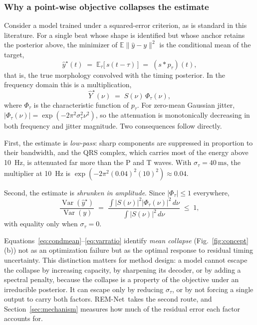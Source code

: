 \documentclass[lettersize,journal]{IEEEtran}
\newcommand{\remnet}{REM-Net\xspace}
\begin{document}
\subsubsection*{Why a point-wise objective collapses the estimate}
Consider a model trained under a squared-error criterion, as is standard in this literature. For a single beat whose shape is identified but whose anchor retains the posterior above, the minimizer of $\mathbb{E}\lVert \hat{y} - y \rVert^2$ is the conditional mean of the target,
\begin{equation}
  \hat{y}^\star(t) \;=\; \mathbb{E}_{\tau}\bigl[\, s(t - \tau) \,\bigr] \;=\; (s * p_\tau)(t),
  \label{eq:condmean}
\end{equation}
that is, the true morphology convolved with the timing posterior. In the frequency domain this is a multiplication,
\begin{equation}
  \hat{Y}^\star(\nu) \;=\; S(\nu)\,\Phi_\tau(\nu),
  \label{eq:spectrum}
\end{equation}
where $\Phi_\tau$ is the characteristic function of $p_\tau$. For zero-mean Gaussian jitter, $\lvert \Phi_\tau(\nu) \rvert = \exp(-2\pi^2 \sigma_\tau^2 \nu^2)$, so the attenuation is monotonically decreasing in both frequency and jitter magnitude. Two consequences follow directly.

First, the estimate is \emph{low-pass}: sharp components are suppressed in proportion to their bandwidth, and the QRS complex, which carries most of the energy above \SI{10}{\hertz}, is attenuated far more than the P and T waves. With $\sigma_\tau = \SI{40}{\milli\second}$, the multiplier at \SI{10}{\hertz} is $\exp(-2\pi^2(0.04)^2(10)^2) \approx 0.04$.

Second, the estimate is \emph{shrunken in amplitude}. Since $\lvert \Phi_\tau \rvert \leq 1$ everywhere,
\begin{equation}
  \frac{\operatorname{Var}(\hat{y}^\star)}{\operatorname{Var}(y)} \;=\; \frac{\int \lvert S(\nu) \rvert^2 \lvert \Phi_\tau(\nu) \rvert^2 \, d\nu}{\int \lvert S(\nu) \rvert^2 \, d\nu} \;\leq\; 1,
  \label{eq:varratio}
\end{equation}
with equality only when $\sigma_\tau = 0$.

Equations~\eqref{eq:condmean}--\eqref{eq:varratio} identify \emph{mean collapse} (Fig.~\ref{fig:concept}(b)) not as an optimization failure but as the optimal response to residual timing uncertainty. This distinction matters for method design: a model cannot escape the collapse by increasing capacity, by sharpening its decoder, or by adding a spectral penalty, because the collapse is a property of the objective under an irreducible posterior. It can escape only by reducing $\sigma_\tau$, or by not forcing a single output to carry both factors. \remnet\ takes the second route, and Section~\ref{sec:mechanism} measures how much of the residual error each factor accounts for.
\end{document}
